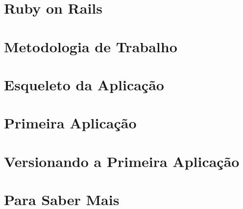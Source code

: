 \documentclass[t, 				             
			   final,
			   12pt, 				         
			   xcolor={usenames,dvipsnames}, 
			   table]{beamer}
\begin{document}
	
	
	  	
    
    \section{Ruby on Rails}
		
	
	
	
    
    \section{Metodologia de Trabalho}
    

    \section{Esqueleto da Aplicação}
    
   
    \section{Primeira Aplicação}
    
    
    
    
    
    
    

    \section{Versionando a Primeira Aplicação}
    
    

    
    
    \section{Para Saber Mais}
	
\end{document}
